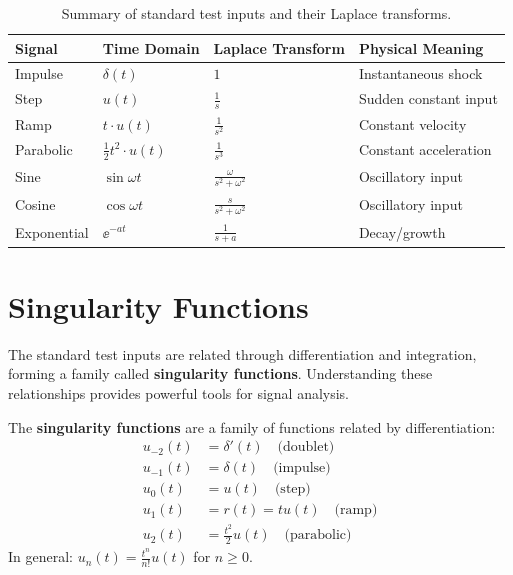\begin{table}[htbp]
\centering
\begin{tabular}{llll}
\toprule
\textbf{Signal} & \textbf{Time Domain} & \textbf{Laplace Transform} & \textbf{Physical Meaning} \\
\midrule
Impulse & $\delta(t)$ & $1$ & Instantaneous shock \\
Step & $u(t)$ & $\frac{1}{s}$ & Sudden constant input \\
Ramp & $t \cdot u(t)$ & $\frac{1}{s^2}$ & Constant velocity \\
Parabolic & $\frac{1}{2}t^2 \cdot u(t)$ & $\frac{1}{s^3}$ & Constant acceleration \\
Sine & $\sin\omega t$ & $\frac{\omega}{s^2+\omega^2}$ & Oscillatory input \\
Cosine & $\cos\omega t$ & $\frac{s}{s^2+\omega^2}$ & Oscillatory input \\
Exponential & $\ee^{-at}$ & $\frac{1}{s+a}$ & Decay/growth \\
\bottomrule
\end{tabular}
\caption{Summary of standard test inputs and their Laplace transforms.}
\label{tab:test_inputs}
\end{table}

\section{Singularity Functions}

The standard test inputs are related through differentiation and integration, forming a family called \textbf{singularity functions}. Understanding these relationships provides powerful tools for signal analysis.

\begin{definitionbox}[title=Definition 10.6: Singularity Functions]
The \textbf{singularity functions} are a family of functions related by differentiation:
\begin{align}
u_{-2}(t) &= \delta'(t) \quad \text{(doublet)} \\
u_{-1}(t) &= \delta(t) \quad \text{(impulse)} \\
u_0(t) &= u(t) \quad \text{(step)} \\
u_1(t) &= r(t) = tu(t) \quad \text{(ramp)} \\
u_2(t) &= \frac{t^2}{2}u(t) \quad \text{(parabolic)}
\end{align}
In general: $u_n(t) = \frac{t^n}{n!}u(t)$ for $n \geq 0$.
\end{definitionbox}

